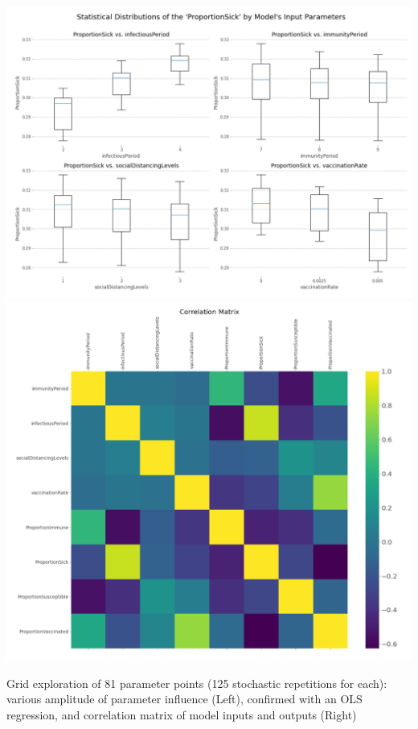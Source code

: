 {\includegraphics[width=0.49\linewidth]{../figures/boxplots.png}
\includegraphics[width=0.49\linewidth]{../figures/correlations.png}

\bigskip
\bigskip

Grid exploration of 81 parameter points (125 stochastic repetitions for each): various amplitude of parameter influence (Left), confirmed with an OLS regression, and correlation matrix of model inputs and outputs (Right)

}

